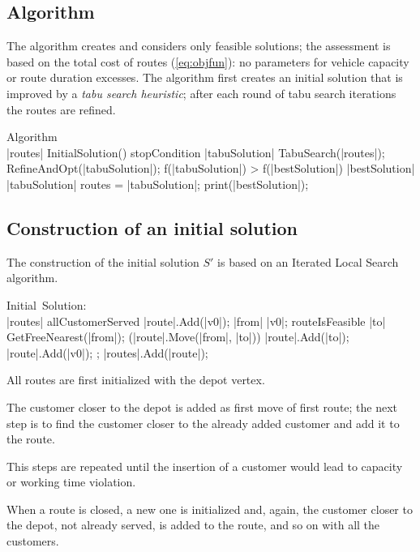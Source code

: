 \documentclass[twoside]{article}
\begin{document}
\begin{multicols}{2}
\section{Algorithm}
The algorithm creates and considers only feasible solutions; the assessment is based on the total cost of routes (\ref{eq:objfun}): no parameters for vehicle capacity or route duration excesses.\newline
The algorithm first creates an initial solution that is improved by a \textit{tabu search heuristic}; after each round of tabu search iterations the routes are refined.
\begin{program}
	\mbox{Algorithm}
	\BEGIN \\ %
	|routes| \gets InitialSolution()
	\WHILE \NOT stopCondition \DO
		|tabuSolution| \gets TabuSearch(|routes|);
		RefineAndOpt(|tabuSolution|);
		\IF f(|tabuSolution|) > f(|bestSolution|)
		\THEN
			|bestSolution| \gets |tabuSolution|
		\FI
		routes = |tabuSolution|;
	\OD
	print(|bestSolution|);
	\END
\end{program}

\subsection{Construction of an initial solution}
The construction of the initial solution $S'$ is based on an Iterated Local Search algorithm.

\begin{program}
	\mbox{Initial Solution:}
	\BEGIN \\ %
		|routes| \gets []
		\WHILE \NOT allCustomerServed \DO
			|route|.Add(|v0|); 
			|from| \gets |v0|;
			\WHILE routeIsFeasible \DO
				|to| \gets GetFreeNearest(|from|);
				\IF (|route|.Move(|from|, |to|)) 
				\THEN 
				|route|.Add(|to|); 
				\ELSE
				|route|.Add(|v0|); 
				\EXIT;
				\FI
			\OD
			|routes|.Add(|route|); 
		\OD
	\END
\end{program}
All routes are first initialized with the depot vertex. 

The customer closer to the depot is added as first move of first route; the next step is to find the customer closer to the already added customer and add it to the route.

This steps are repeated until the insertion of a customer would lead to capacity or working time violation.

When a route is closed, a new one is initialized and, again, the customer closer to the depot, not already served, is added to the route, and so on with all the customers.


\end{multicols}
\end{document}
